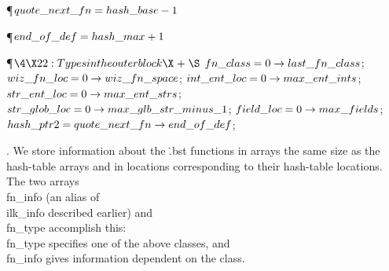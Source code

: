 \Y\P\D {}$\\{quote\_next\_fn}=\\{hash\_base}-1$\par
\P\D {}$\\{end\_of\_def}=\\{hash\_max}+1$\par
\Y\P$\4\X22:Types in the outer block\X\mathrel{+}\S$\6
$\\{fn\_class}=0\to\\{last\_fn\_class}$;\6
$\\{wiz\_fn\_loc}=0\to\\{wiz\_fn\_space}$;\6
$\\{int\_ent\_loc}=0\to\\{max\_ent\_ints}$;\6
$\\{str\_ent\_loc}=0\to\\{max\_ent\_strs}$;\6
$\\{str\_glob\_loc}=0\to\\{max\_glb\_str\_minus\_1}$;\6
$\\{field\_loc}=0\to\\{max\_fields}$;\6
$\\{hash\_ptr2}=\\{quote\_next\_fn}\to\\{end\_of\_def}$;\par
\fi

.
We store information about the \.{.bst} functions in arrays the same
size as the hash-table arrays and in locations corresponding to their
hash-table locations.  The two arrays \\{fn\_info} (an alias of
\\{ilk\_info} described earlier) and \\{fn\_type} accomplish this: \\{fn\_type}
specifies one of the above classes, and \\{fn\_info} gives information
dependent on the class.


